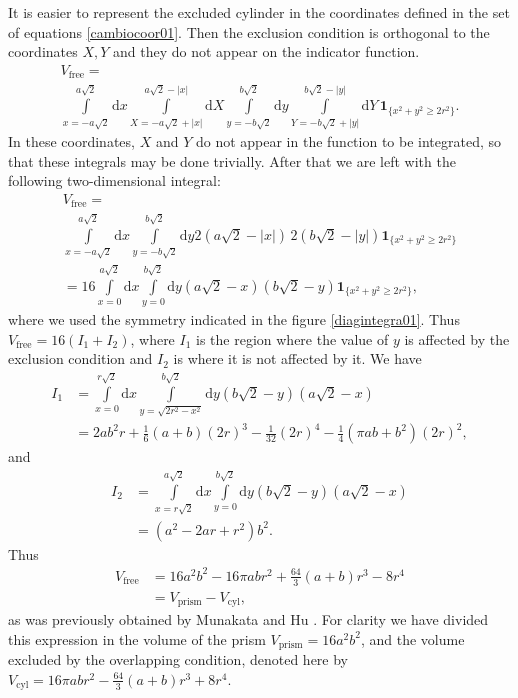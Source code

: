 \documentclass[letterpaper,10pt, jcp, aps]{revtex4-1}
\newcommand{\rd}{\!\mathrm{d}}
\newcommand{\indicator}[1]{\mathbf{1}_{ \{   #1 \} } }
\begin{document}
It is easier to represent the  
excluded cylinder in the coordinates defined in 
the set of equations \ref{cambiocoor01}. Then the exclusion condition
is orthogonal to the coordinates $X,Y$ and they do not appear
on the indicator function. 
\begin{multline}\label{integraltotal}
 V_\text{free} = \\ \int\limits_{x=-a \sqrt{2}}^{a \sqrt{2}} \rd x 
\int\limits_{X=-a \sqrt{2} + |x| }^{a \sqrt{2} - |x|}  \rd X
 \int\limits_{y=-b \sqrt{2}}^{b \sqrt{2}} \rd y
\int\limits_{Y=-b \sqrt{2} + |y| }^{b \sqrt{2}-|y|}  \rd Y
\, \indicator{ x^2 + y^2 \ge 2r^2  }.
\end{multline}
In these coordinates, $X$ and $Y$ do not appear in the function to be
integrated, 
so that these integrals may be done trivially. After that we are left 
with the  following two-dimensional integral:
\begin{multline}
 V_\text{free}  = \\ \int\limits_{x=-a \sqrt{2}}^{a \sqrt{2}} \rd x  \int\limits_{y=-b \sqrt{2}}^{b \sqrt{2}} \rd y
2 \left( a \sqrt{2} - |x| \right) \, 2 \left( b \sqrt{2} - |y| \right) \indicator{ x^2 + y^2 \ge 2r^2 } \\
 = 16 \int\limits_{x=0}^{a \sqrt{2}} \rd x  \int\limits_{y=0}^{b \sqrt{2}} \rd y 
\left( a \sqrt{2} - x \right) \left( b \sqrt{2} - y \right) \indicator{ x^2 + y^2 \ge 2r^2 },
\end{multline}
where we used the symmetry indicated in the figure \ref{diagintegra01}.
Thus $V_\text{free} = 16(I_1 + I_2)$, where $I_1$ is the region where the value of $y$
is affected by the exclusion condition and $I_2$ is where it is not affected
by it. 
We have
\begin{align}
 I_1 &= \int\limits_{x=0}^{r\sqrt{2}} \rd x \int\limits_{y = \sqrt{ 2r^2 - x^2}}^{b \sqrt{2}} \rd y
\left( b \sqrt{2} - y \right)  \left( a \sqrt{2} - x \right) \\
&= 	
2 a b^{2} r  + \textstyle \frac{1}{6} (a+b) (2r)^{3} - \frac{1}{32}  (2r)^{4} - \frac{1}{4} {\left(\pi a b + b^{2}\right)} (2r)^2,
\end{align}
and
\begin{align}
 I_2 &= \int\limits_{x=r  \sqrt{2}}^{a \sqrt{2}} \rd x  \int\limits_{y = 0}^{b \sqrt{2}} \rd y
 \left( b \sqrt{2} - y \right)  \left( a \sqrt{2} - x \right)  \\
&=	
{\left( a^{2} - 2ar +   r^{2}\right)} b^{2}.
\end{align}
Thus 
\begin{align}\label{volumeabd}
 V_\text{free}
 & =  16 a^{2} b^{2}  - 16 \pi a b r^{2} + \textstyle \frac{64}{3} (a+b) r^{3}  - 8 r^{4} \\
&= V_\text{prism} - V_\text{cyl},
\end{align}
as was previously obtained by Munakata and Hu \cite{Munakata02}.
For clarity we have divided this expression in the volume of the prism 
$V_\text{prism}=16 a^2 b^2$, and  the volume excluded by the overlapping
condition, denoted here by 
$V_\text{cyl}=  16 \pi a b r^{2} - \textstyle \frac{64}{3} (a+b) r^{3}  + 8 r^{4}$.
\end{document}
